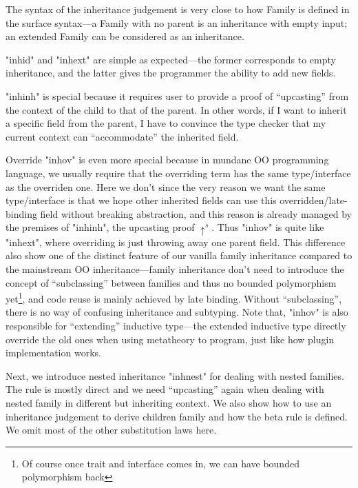 The syntax of the inheritance judgement is very close to how Family is
defined in the surface syntax---a Family with no parent is an
inheritance with empty input; an extended Family can be considered as an
inheritance.

"inhid" and "inhext" are simple as expected---the former corresponds to
empty inheritance, and the latter gives the programmer the ability to
add new fields.

"inhinh" is special because it requires user to provide a proof of
``upcasting'' from the context of the child to that of the parent.
In other words, if I want to inherit a specific field from the parent, I
have to convince the type checker that my current context can
``accommodate'' the inherited field. 

Override "inhov" is even more special because in mundane OO programming language, we usually require that the overriding term has the same type/interface as the overriden one.  Here we don't since the very reason we want the same type/interface is that we hope other inherited fields can use this overridden/late-binding field without breaking abstraction, and this reason is already managed by the premises of "inhinh", the upcasting proof $\uparrow^s$. Thus "inhov" is quite like "inhext", where overriding is just throwing away one parent field. This difference also show one of the distinct feature of our vanilla family inheritance compared to the mainstream OO inheritance---family inheritance don't need to introduce the concept of ``subclassing'' between families and thus no bounded polymorphism yet\footnote{Of course once trait and interface comes in, we can have bounded polymorphism back}, and code reuse is mainly achieved by late binding. Without ``subclassing'', there is no way of confusing inheritance and subtyping. Note that, "inhov" is also responsible for ``extending'' inductive type---the extended inductive type directly override the old ones when using metatheory to program, just like how plugin implementation works.

Next, we introduce nested inheritance "inhnest" for dealing with nested families. The rule is mostly direct and we need ``upcasting'' again when dealing with nested family in different but inheriting context.  We also show how to use an inheritance judgement to derive children family and how the beta rule is defined. We omit most of the other substitution laws here.


